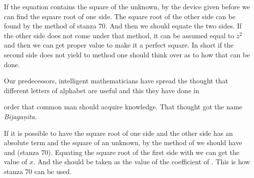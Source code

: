 \documentclass[]{article}
\begin{document}
{If the equation contains the square of the unknown, by the device given
before we can find the square root of one side. The square root of the
other side can be found by the method of stanza 70. And then we should
equate the two sides. If the other side does not come under that method,
it can be assumed equal to $z^{2}$ and then we can get proper value to
make it a perfect square. In short if the second side does not yield to {} method one should think over as to how that can be done.}

\begin{quote}  {}  \end{quote}

{Our predecessors, intelligent mathematicians have spread the thought
that different letters of alphabet are useful and this they have done
in}
\newpage
\large

\noindent order that common man should acquire knowledge. That thought got the name \textit{Bījagaṇita}.

\begin{quote}  {
}  \end{quote}

{If it is possible to have the square root of one side and the other
side has an absolute term and the square of an unknown, by the method of
{} we should have {} and {} (stanza 70). Equating the
square root of the first side with {} we can get the value of $x.$
And the {} should be taken as the value of the coefficient of {}. This is how stanza 70 can be used.}

\begin{quote}  {
}  \end{quote}
\end{document}
